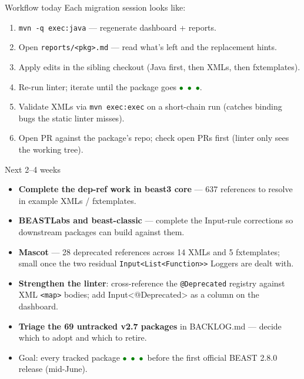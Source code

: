 \documentclass[aspectratio=169]{beamer}
\newcommand{\G}{\textcolor{green}{$\bullet$}}
\begin{document}
\begin{frame}{Workflow today}
  Each migration session looks like:
  \begin{enumerate}
    \item \texttt{mvn -q exec:java} --- regenerate dashboard + reports.
    \item Open \texttt{reports/<pkg>.md} --- read what's left and the replacement hints.
    \item Apply edits in the sibling checkout (Java first, then XMLs, then fxtemplates).
    \item Re-run linter; iterate until the package goes \G\ \G\ \G.
    \item Validate XMLs via \texttt{mvn exec:exec} on a short-chain run (catches binding bugs the static linter misses).
    \item Open PR against the package's repo; check open PRs first (linter only sees the working tree).
  \end{enumerate}
\end{frame}

\begin{frame}{Next 2--4 weeks}
  \begin{itemize}
    \item \textbf{Complete the dep-ref work in beast3 core} --- 637 references to resolve in example XMLs / fxtemplates.
    \item \textbf{BEASTLabs and beast-classic} --- complete the Input-rule corrections so downstream packages can build against them.
    \item \textbf{Mascot} --- 28 deprecated references across 14 XMLs and 5 fxtemplates; small once the two residual \texttt{Input<List<Function>>} Loggers are dealt with.
    \item \textbf{Strengthen the linter}: cross-reference the \texttt{@Deprecated} registry against XML \texttt{<map>} bodies; add Input<@Deprecated> as a column on the dashboard.
    \item \textbf{Triage the 69 untracked v2.7 packages} in BACKLOG.md --- decide which to adopt and which to retire.
    \item Goal: every tracked package \G\ \G\ \G\ before the first official BEAST 2.8.0 release (mid-June).
  \end{itemize}
\end{frame}
\end{document}
